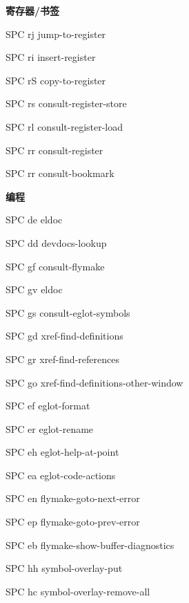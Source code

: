 \documentclass[10pt]{article}
\renewcommand\section[1]{\bigskip\par\textbf{\color{heading}\large#1}\smallskip}
\renewcommand\subsection[1]{\smallskip\par\textbf{\color{heading}#1}}
\begin{document}
\begin{multicols}{3}
  \subsection{寄存器/书签}
  \begin{keylist}
  \item[SPC rj] jump-to-register
  \item[SPC ri] insert-register
  \item[SPC rS] copy-to-register
  \item[SPC rs] consult-register-store
  \item[SPC rl] consult-register-load
  \item[SPC rr] consult-register
  \item[SPC rr] consult-bookmark
  \end{keylist}

  \section{编程}
  \begin{keylist}
  \item[SPC de] eldoc
  \item[SPC dd] devdocs-lookup
  \item[SPC gf] consult-flymake
  \item[SPC gv] eldoc
  \item[SPC gs] consult-eglot-symbols
  \item[SPC gd] xref-find-definitions
  \item[SPC gr] xref-find-references
  \item[SPC go] xref-find-definitions-other-window
  \item[SPC ef] eglot-format
  \item[SPC er] eglot-rename

  \item[SPC eh] eglot-help-at-point
  \item[SPC ea] eglot-code-actions
  \item[SPC en] flymake-goto-next-error
  \item[SPC ep] flymake-goto-prev-error
  \item[SPC eb] flymake-show-buffer-diagnostics
  \item[SPC hh] symbol-overlay-put
  \item[SPC hc] symbol-overlay-remove-all
  \end{keylist}


\end{multicols}
\end{document}
